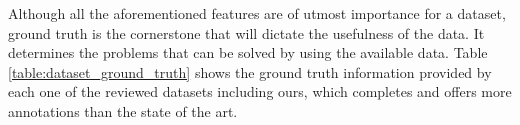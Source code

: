Although all the aforementioned features are of utmost importance for a dataset, ground truth is the cornerstone that will dictate the usefulness of the data. It determines the problems that can be solved by using the available data.  Table \ref{table:dataset_ground_truth} shows the ground truth information provided by each one of the reviewed datasets including ours, which completes and offers more annotations than the state of the art.

\begin{table}[!t]
    \centering
\end{table}
